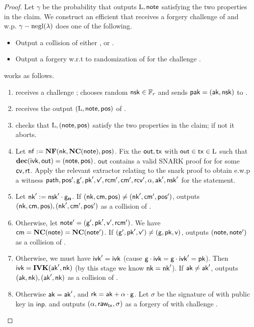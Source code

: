 \documentclass[11pt]{article}
\numberwithin{equation}{section} %
\numberwithin{figure}{section} %
\newcommand{\inp}{\ensuremath{\mathsf{inp}}\xspace}
\newcommand{\out}{\ensuremath{\mathsf{out}}\xspace}
\begin{document}
\begin{proof}
Let $\gamma$ be the probability that \adv outputs $\mathrm{L},\mathsf{note}$ satisfying the two properties in the claim.
We construct an efficient \advprime that receives a forgery challenge \ak of \schnorr and w.p. $\gamma-\mathrm{negl}(\lambda)$ does one of the following.
\begin{itemize}
\item Output a collision of either \NF, \notecom or \IVK.
 \item Output a forgery w.r.t to randomization of \schnorr for the challenge \ak.
\end{itemize}


\advprime works as follows.

 \begin{enumerate}
  \item  \advprime receives a challenge \ak; chooses random $\mathsf{nsk}\in {\mathbb F}_r$ and sends $\mathsf{pak}=(\mathsf{ak},\mathsf{nsk})$ to \adv.
\item \advprime receives the output $(\mathrm{L},\mathsf{note},\mathsf{pos})$ of \adv.
\item \advprime checks that $\mathrm{L},(\mathsf{note},\mathsf{pos})$ satisfy the two properties in the claim; if not it aborts.
\item  Let $\mathsf{nf} := \mathbf{NF}(\mathsf{nk},\mathbf{NC}(\mathsf{note}),\mathsf{pos})$.
Fix the $\out,\tx$ with $\out\in\tx\in \ledger$ such that $\dec(\ivk,\out) = (\note,\pos)$.
\out contains a valid SNARK proof for \spendstatement{\rt,\cv,\nf,\rk} for some $\mathsf{cv},\mathsf{rt}$.
Apply the relevant extractor \ext relating to the snark proof to
obtain e.w.p \negl a witness $\mathsf{path},\mathsf{pos}',\mathsf{g}',\mathsf{pk}',\mathsf{v}',\mathsf{rcm}',\mathsf{cm}',\mathsf{rcv}',\alpha,\mathsf{ak}',\mathsf{nsk}'$ for the statement.
\item Let $\mathsf{nk}' := \mathsf{nsk}'\cdot \mathsf{g}_{\mathbf{n}}$. If $(\mathsf{nk},\mathsf{cm},\mathsf{pos})\neq (\mathsf{nk}',\mathsf{cm}',\mathsf{pos}')$, \advprime outputs $(\mathsf{nk},\mathsf{cm},\mathsf{pos}),(\mathsf{nk}',\mathsf{cm}',\mathsf{pos}')$ as a collision of \NF.
\item Otherwise, let $\mathsf{note}' = (\mathsf{g}',\mathsf{pk}',\mathsf{v}',\mathsf{rcm}')$. We have $\mathsf{cm}=\mathbf{NC}(\mathsf{note})=\mathbf{NC}(\mathsf{note}')$. If $(\mathsf{g}',\mathsf{pk}',\mathsf{v}')\neq (\mathsf{g},\mathsf{pk},\mathsf{v})$, \advprime outputs $(\mathsf{note},\mathsf{note}')$ as a collision of \notecom.
\item Otherwise, we must have $\mathsf{ivk}'=\mathsf{ivk}$ (cause $\mathsf{g}\cdot \mathsf{ivk} = \mathsf{g} \cdot \mathsf{ivk}' = \mathsf{pk}$). Then $\mathsf{ivk} = \mathbf{IVK}(\mathsf{ak}',\mathsf{nk})$ (by this stage we know $\mathsf{nk}=\mathsf{nk}'$).
If $\mathsf{ak}\neq \mathsf{ak}'$, \advprime outputs $(\mathsf{ak},\mathsf{nk}),  (\mathsf{ak}',\mathsf{nk})$ as a collision of \IVK.
\item Otherwise $\mathsf{ak}=\mathsf{ak}'$, and $\mathsf{rk} = \mathsf{ak} + \alpha \cdot \mathsf{g}$. Let $\sigma$ be the signature of \rawtx with public key \rk in \inp.
and \advprime outputs $(\alpha, \mathsf{raw_{tx}}, \sigma)$ as a forgery of \schnorr with challenge \ak.
 \end{enumerate}

 
 
\end{proof}
\end{document}

